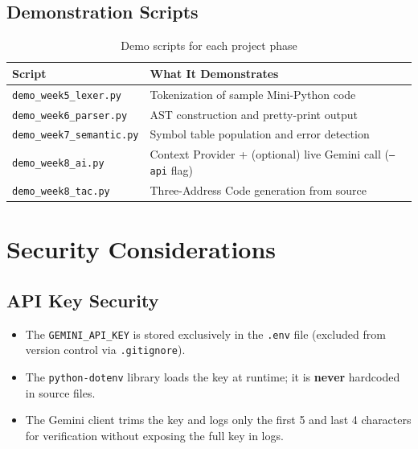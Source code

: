 \documentclass[a4paper,11pt]{article}
\begin{document}
\subsection{Demonstration Scripts}

\begin{table}[h!]
\centering
\begin{tabular}{|l|l|}
\hline
\rowcolor{blue!10}
\textbf{Script} & \textbf{What It Demonstrates} \\
\hline
\texttt{demo\_week5\_lexer.py} & Tokenization of sample Mini-Python code \\
\hline
\texttt{demo\_week6\_parser.py} & AST construction and pretty-print output \\
\hline
\texttt{demo\_week7\_semantic.py} & Symbol table population and error detection \\
\hline
\texttt{demo\_week8\_ai.py} & Context Provider + (optional) live Gemini call (\texttt{--api} flag) \\
\hline
\texttt{demo\_week8\_tac.py} & Three-Address Code generation from source \\
\hline
\end{tabular}
\caption{Demo scripts for each project phase}
\end{table}


\section{Security Considerations}

\subsection{API Key Security}

\begin{itemize}
    \item The \texttt{GEMINI\_API\_KEY} is stored exclusively in the \texttt{.env} file (excluded from version control via \texttt{.gitignore}).
    \item The \texttt{python-dotenv} library loads the key at runtime; it is \textbf{never} hardcoded in source files.
    \item The Gemini client trims the key and logs only the first 5 and last 4 characters for verification without exposing the full key in logs.
\end{itemize}
\end{document}
